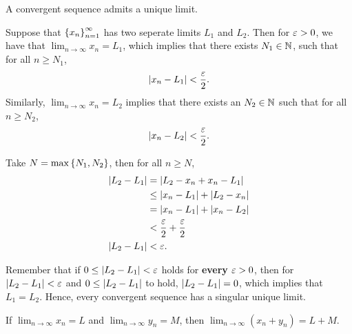 \documentclass[12pt]{article}
\theoremstyle{definition}
\renewenvironment{proof}[1][\proofname]{\vspace{-10pt}\begin{replacementproof}}{\end{replacementproof}}
\begin{document}
    \begin{prop}
        A convergent sequence admits a unique limit.
    \end{prop}
    \begin{proof}
        Suppose that $\left\{x_{n}\right\}_{n = 1}^{\infty}$ has two seperate limits $L_{1}$ and $L_{2}$. Then for $\varepsilon > 0$, we have that $\displaystyle\lim_{n \rightarrow \infty}x_{n} = L_{1}$, which implies that there exists $N_{1} \in \mathbb{N}$, such that for all $n \geq N_{1}$, 
        \begin{equation*}
            \left|x_{n} - L_{1}\right| < \frac{\varepsilon}{2}.
        \end{equation*}
        Similarly, $\displaystyle\lim_{n \rightarrow \infty}x_{n} = L_{2}$ implies that there exists an $N_{2} \in \mathbb{N}$ such that for all $n \geq N_{2}$, 
        \begin{equation*}
            \left|x_{n} - L_{2}\right| < \frac{\varepsilon}{2}.
        \end{equation*}

        Take $N = \max\left\{N_{1}, N_{2}\right\}$, then for all $n \geq N$,
        \begin{align*}
            \left|L_{2} - L_{1}\right| &= \left|L_{2} - x_{n} + x_{n} - L_{1}\right| \\
                                &\leq \left|x_{n} - L_{1}\right| + \left|L_{2} - x_{n}\right| \\
                                &= \left|x_{n} - L_{1}\right| + \left|x_{n} - L_{2}\right| \\
                                &< \frac{\varepsilon}{2} + \frac{\varepsilon}{2} \\
            \left|L_{2} - L_{1}\right| &< \varepsilon.          
        \end{align*}

        Remember that if $0 \leq \left|L_{2} - L_{1}\right| < \varepsilon$ holds for \textbf{every} $\varepsilon > 0$, then for $\left|L_{2} - L_{1}\right| < \varepsilon$ and $0 \leq \left|L_{2} - L_{1}\right|$ to hold, $\left|L_{2} - L_{1}\right| = 0$, which implies that $L_{1} = L_{2}$. Hence, every convergent sequence has a singular unique limit.
    \end{proof}
    \begin{prop}
        If $\displaystyle\lim_{n \rightarrow \infty}x_{n} = L$ and $\displaystyle\lim_{n \rightarrow \infty}y_{n} = M$, then $\displaystyle\lim_{n \rightarrow \infty}(x_{n} + y_{n}) = L + M$.
    \end{prop}
\end{document}
